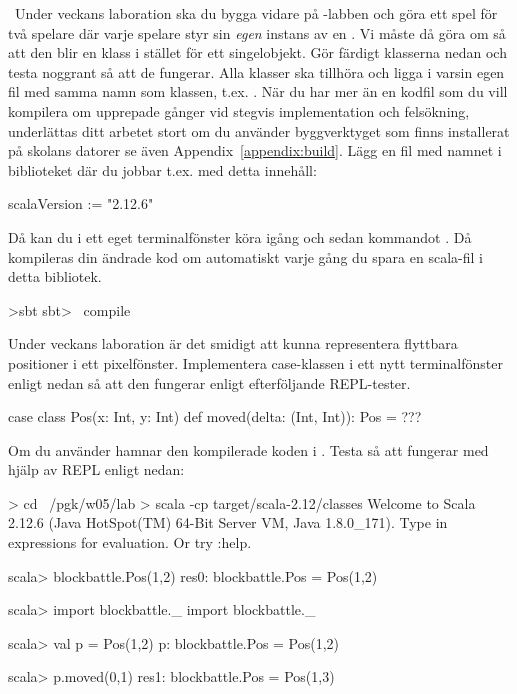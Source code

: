 \Task\label{exe:classes:labprep}  \what~Under veckans laboration ska du bygga vidare på -labben och göra ett spel för två spelare där varje spelare styr sin \emph{egen} instans av en . Vi måste då göra om  så att den blir en klass i stället för ett singelobjekt. Gör färdigt klasserna nedan och testa noggrant så att de fungerar. Alla klasser ska tillhöra  och ligga i varsin egen fil med samma namn som klassen, t.ex. . När du har mer än en kodfil som du vill kompilera om upprepade gånger vid stegvis implementation och felsökning, underlättas ditt arbetet stort om du använder byggverktyget  som finns installerat på skolans datorer {se även Appendix~\ref{appendix:build}}. Lägg en fil med namnet  i biblioteket där du jobbar t.ex.  med detta innehåll:
\begin{Code}
scalaVersion := "2.12.6"
\end{Code}
Då kan du i ett eget terminalfönster köra igång  och sedan kommandot . Då kompileras din ändrade kod om automatiskt varje gång du spara en scala-fil i detta bibliotek.
\begin{REPLnonum}
>sbt
sbt> ~compile
\end{REPLnonum}

\Subtask Under veckans laboration är det smidigt att kunna representera flyttbara positioner i ett pixelfönster. Implementera case-klassen  i ett nytt terminalfönster enligt nedan så att den fungerar enligt efterföljande REPL-tester.
\begin{Code}
case class Pos(x: Int, y: Int) {
  def moved(delta: (Int, Int)): Pos = ???
}
\end{Code}
Om du använder  hamnar den kompilerade koden i . Testa så att  fungerar med hjälp av REPL enligt nedan:
\begin{REPL}
> cd ~/pgk/w05/lab
> scala -cp target/scala-2.12/classes
Welcome to Scala 2.12.6 (Java HotSpot(TM) 64-Bit Server VM, Java 1.8.0_171).
Type in expressions for evaluation. Or try :help.

scala> blockbattle.Pos(1,2)
res0: blockbattle.Pos = Pos(1,2)

scala> import blockbattle._
import blockbattle._

scala> val p = Pos(1,2)
p: blockbattle.Pos = Pos(1,2)

scala> p.moved(0,1)
res1: blockbattle.Pos = Pos(1,3)
\end{REPL}

